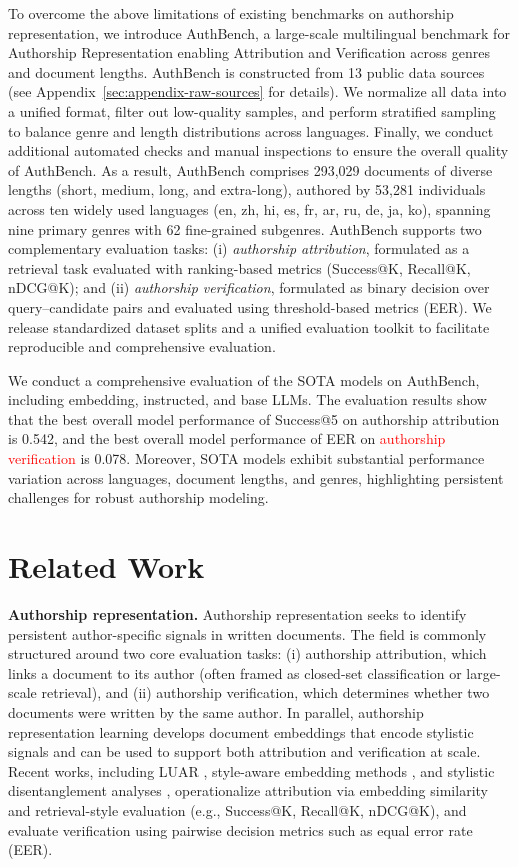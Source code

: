 \documentclass[11pt]{article}
\newcommand{\rev}[1]{\textcolor{red}{#1}}
\begin{document}
To overcome the above limitations of existing benchmarks on authorship representation, we introduce AuthBench, a large-scale multilingual benchmark for Authorship Representation enabling Attribution and Verification across genres and document lengths. AuthBench is constructed from 13 public data sources (see Appendix~\ref{sec:appendix-raw-sources} for details). We normalize all data into a unified format,  filter out low-quality samples, and perform stratified sampling to balance genre and length distributions across languages. Finally, we conduct additional automated checks and manual inspections to ensure the overall quality of AuthBench. As a result, AuthBench comprises 293,029 documents of diverse lengths (short, medium, long, and extra-long), authored by 53,281 individuals across ten widely used languages (en, zh, hi, es, fr, ar, ru, de, ja, ko), spanning nine primary genres with 62 fine-grained subgenres. AuthBench supports two complementary evaluation tasks: (i) \emph{authorship attribution}, formulated as a retrieval task evaluated with ranking-based metrics (Success@K, Recall@K, nDCG@K); and (ii) \emph{authorship verification}, formulated as binary decision over query–candidate pairs and evaluated using threshold-based metrics (EER). We release standardized dataset splits and a unified evaluation toolkit to facilitate reproducible and comprehensive evaluation. 

We conduct a comprehensive evaluation of the SOTA models on AuthBench, including embedding, instructed, and base LLMs. The evaluation results show that the best overall model performance of Success@5 on authorship attribution is 0.542, and the best overall model performance of EER on \rev{authorship verification} is 0.078. Moreover, SOTA models exhibit substantial performance variation across languages, document lengths, and genres, highlighting persistent challenges for robust authorship modeling.

\section{Related Work}
\label{sec:related-work}
\textbf{Authorship representation.} 
Authorship representation \cite{huang2025authorship,habib2025trends,tyo2022state} seeks to identify persistent author-specific signals in written documents. The field is commonly structured around two core evaluation tasks: (i) authorship attribution, which links a document to its author (often framed as closed-set classification or large-scale retrieval), and (ii) authorship verification, which determines whether two documents were written by the same author. In parallel, authorship representation learning develops document embeddings that encode stylistic signals and can be used to support both attribution and verification at scale. Recent works, including LUAR \citep{riverasoto2021luar}, style-aware embedding methods \citep{wang2023canrep}, and stylistic disentanglement analyses \citep{michailidis2022stylometric}, operationalize attribution via embedding similarity and retrieval-style evaluation (e.g., Success@K, Recall@K, nDCG@K), and evaluate verification using pairwise decision metrics such as equal error rate (EER).
\end{document}
